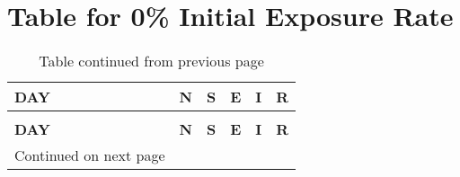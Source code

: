 \chapter{Table for 0\% Initial Exposure Rate}


\begin{longtable}{|l|l|l|l|l|l|}
	\caption{0\% Initial Exposure Rate} \\
	
	\toprule
	\textbf{DAY} & \textbf{N} & \textbf{S} & \textbf{E }& \textbf{I} &\textbf{ R} \\
	\midrule
	\endfirsthead
	\caption*{Table continued from previous page} \\
	\toprule
	\textbf{DAY} & \textbf{N} & \textbf{S} & \textbf{E }& \textbf{I} &\textbf{ R} \\
	\midrule
	\endhead
	\midrule
	\multicolumn{1}{r}{\footnotesize Continued on next page}
	\endfoot
	\bottomrule
	\endlastfoot


\end{longtable}
